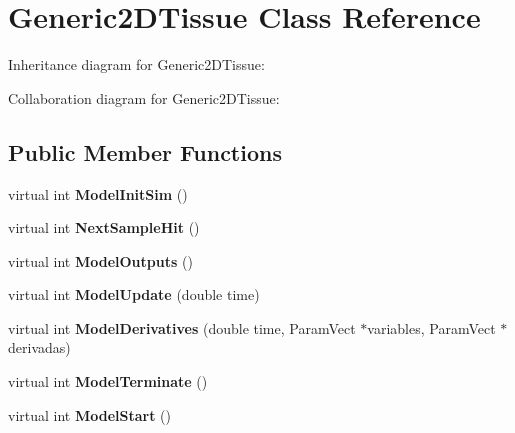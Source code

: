 \hypertarget{classGeneric2DTissue}{}\section{Generic2\+D\+Tissue Class Reference}
\label{classGeneric2DTissue}


Inheritance diagram for Generic2\+D\+Tissue\+:


Collaboration diagram for Generic2\+D\+Tissue\+:
\subsection*{Public Member Functions}
\begin{DoxyCompactItemize}
\item 
virtual int {\bfseries Model\+Init\+Sim} ()\hypertarget{classGeneric2DTissue_aef82bfa4557e1a844b2aba691042658d}{}\label{classGeneric2DTissue_aef82bfa4557e1a844b2aba691042658d}

\item 
virtual int {\bfseries Next\+Sample\+Hit} ()\hypertarget{classGeneric2DTissue_a3a0d00423164ea2d4a79f4c49bc610f7}{}\label{classGeneric2DTissue_a3a0d00423164ea2d4a79f4c49bc610f7}

\item 
virtual int {\bfseries Model\+Outputs} ()\hypertarget{classGeneric2DTissue_abb8d835736eee9fc3b4af81b2900e4f6}{}\label{classGeneric2DTissue_abb8d835736eee9fc3b4af81b2900e4f6}

\item 
virtual int {\bfseries Model\+Update} (double time)\hypertarget{classGeneric2DTissue_a629e80c6292f8cc9ab1014383032a108}{}\label{classGeneric2DTissue_a629e80c6292f8cc9ab1014383032a108}

\item 
virtual int {\bfseries Model\+Derivatives} (double time, Param\+Vect $\ast$variables, Param\+Vect $\ast$derivadas)\hypertarget{classGeneric2DTissue_a8462e200e6b98f69864ac32936f63fd4}{}\label{classGeneric2DTissue_a8462e200e6b98f69864ac32936f63fd4}

\item 
virtual int {\bfseries Model\+Terminate} ()\hypertarget{classGeneric2DTissue_a841cb7efc35479081f43542d8d92b518}{}\label{classGeneric2DTissue_a841cb7efc35479081f43542d8d92b518}

\item 
virtual int {\bfseries Model\+Start} ()\hypertarget{classGeneric2DTissue_a5fe6a443f353f06ce3fa7f7143dd42f6}{}\label{classGeneric2DTissue_a5fe6a443f353f06ce3fa7f7143dd42f6}

\end{DoxyCompactItemize}
